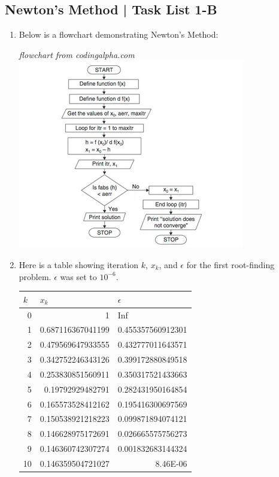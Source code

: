 \documentclass[12pt]{extarticle}
\begin{document}
\subsection{Newton's Method | Task List 1-B}
\begin{enumerate}
\item Below is a flowchart demonstrating Newton's Method:
\begin{center}
\textit{flowchart from codingalpha.com}
\includegraphics[width = .6\textwidth]{newton_flow}
\end{center}
\item Here is a table showing iteration $k$, $x_k$, and $\epsilon$ for the first root-finding problem. $\epsilon$ was set to $10^{-6}$.

\begin{center}
\begin{adjustbox}{width=.45\columnwidth,center}
\begin{tabular}{|r|r|r|}
\hline
\multicolumn{1}{|l|}{$k$} & \multicolumn{1}{l|}{$x_k$} & \multicolumn{1}{l|}{$\epsilon$} \\ \hline
0 & 1 & \multicolumn{1}{l|}{Inf} \\ \hline
1 & 0.687116367041199 & 0.455357560912301 \\ \hline
2 & 0.479569647933555 & 0.432777011643571 \\ \hline
3 & 0.342752246343126 & 0.399172880849518 \\ \hline
4 & 0.253830851560911 & 0.350317521433663 \\ \hline
5 & 0.19792929482791 & 0.282431950164854 \\ \hline
6 & 0.165573528412162 & 0.195416300697569 \\ \hline
7 & 0.150538921218223 & 0.099871894074121 \\ \hline
8 & 0.146628975172691 & 0.026665575756273 \\ \hline
9 & 0.146360742307274 & 0.001832683144324 \\ \hline
10 & 0.146359504721027 & 8.46E-06 \\ \hline
\end{tabular}
\end{adjustbox}
\label{}


\end{center}
\end{enumerate}
\end{document}
